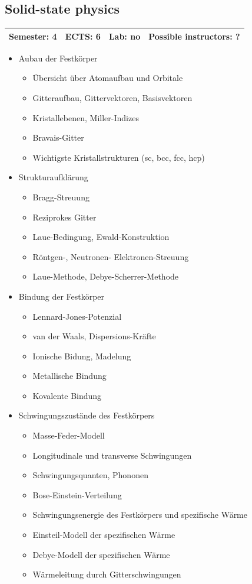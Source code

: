 \documentclass[12pt,twoside,fleqn,a4paper]{article}
\begin{document}
\subsection{Solid-state physics}
\begin{tabular}{llll} \hline
\textbf{Semester:} 4 & \textbf{ECTS:} 6 & \textbf{Lab:} no & \textbf{Possible instructors:} ?\\
\hline
\end{tabular}

\begin{itemize}
\setlength\itemsep{0cm}
\item Aubau der Festkörper
\begin{itemize}
\item Übersicht über Atomaufbau und Orbitale
\item Gitteraufbau, Gittervektoren, Basisvektoren
\item Kristallebenen, Miller-Indizes
\item Bravais-Gitter
\item Wichtigste Kristallstrukturen (sc, bcc, fcc, hcp)
\end{itemize}

\item Strukturaufklärung
\begin{itemize}
\item Bragg-Streuung
\item Reziprokes Gitter
\item Laue-Bedingung, Ewald-Konstruktion
\item Röntgen-, Neutronen- Elektronen-Streuung
\item Laue-Methode, Debye-Scherrer-Methode
\end{itemize}

\item Bindung der Festkörper
\begin{itemize}
\item Lennard-Jones-Potenzial
\item van der Waals, Dispersions-Kräfte
\item Ionische Bidung, Madelung
\item Metallische Bindung
\item Kovalente Bindung
\end{itemize}

\item Schwingungszustände des Festkörpers
\begin{itemize}
\item Masse-Feder-Modell
\item Longitudinale und transverse Schwingungen
\item Schwingungsquanten, Phononen
\item Bose-Einstein-Verteilung
\item Schwingungsenergie des Festkörpers und spezifische Wärme
\item Einsteil-Modell der spezifischen Wärme
\item Debye-Modell der spezifischen Wärme
\item Wärmeleitung durch Gitterschwingungen
\end{itemize}


\end{itemize}
\end{document}
